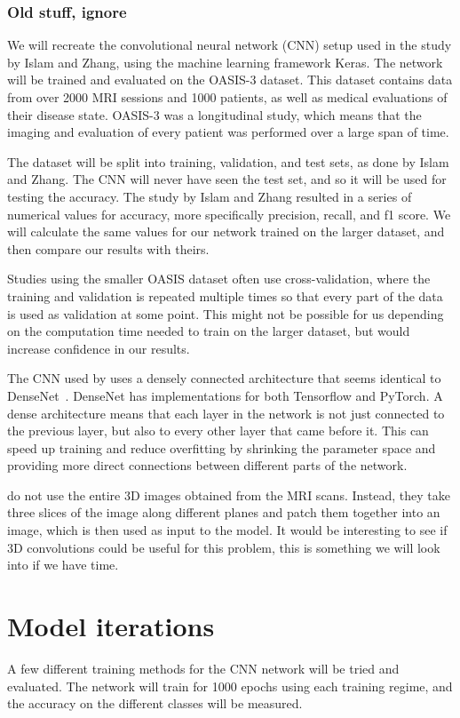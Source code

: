 \documentclass{kththesis}
\begin{document}
\subsubsection{Old stuff, ignore}
We will recreate the convolutional neural network (CNN) setup used in the study by Islam and Zhang, using the machine learning framework Keras. The network will be trained and evaluated on the OASIS-3 dataset. This dataset contains data from over 2000 MRI sessions and 1000 patients, as well as medical evaluations of their disease state. OASIS-3 was a longitudinal study, which means that the imaging and evaluation of every patient was performed over a large span of time.

The dataset will be split into training, validation, and test sets, as done by Islam and Zhang. The CNN will never have seen the test set, and so it will be used for testing the accuracy. The study by Islam and Zhang resulted in a series of numerical values for accuracy, more specifically precision, recall, and f1 score. We will calculate the same values for our network trained on the larger dataset, and then compare our results with theirs. 

Studies using the smaller OASIS dataset often use cross-validation, where the training and validation is repeated multiple times so that every part of the data is used as validation at some point. This might not be possible for us depending on the computation time needed to train on the larger dataset, but would increase confidence in our results.

The CNN used by \textcite{islam2018early} uses a densely connected architecture that seems identical to DenseNet~\cite{huang2017densely}. DenseNet has implementations for both Tensorflow and PyTorch. A dense architecture means that each layer in the network is not just connected to the previous layer, but also to every other layer that came before it. This can speed up training and reduce overfitting by shrinking the parameter space and providing more direct connections between different parts of the network.

\textcite{islam2018early} do not use the entire 3D images obtained from the MRI scans. Instead, they take three slices of the image along different planes and patch them together into an image, which is then used as input to the model. It would be interesting to see if 3D convolutions could be useful for this problem, this is something we will look into if we have time.

\section{Model iterations}
A few different training methods for the CNN network will be tried and evaluated. The network will train for \num{1000} epochs using each training regime, and the accuracy on the different classes will be measured.
\end{document}
